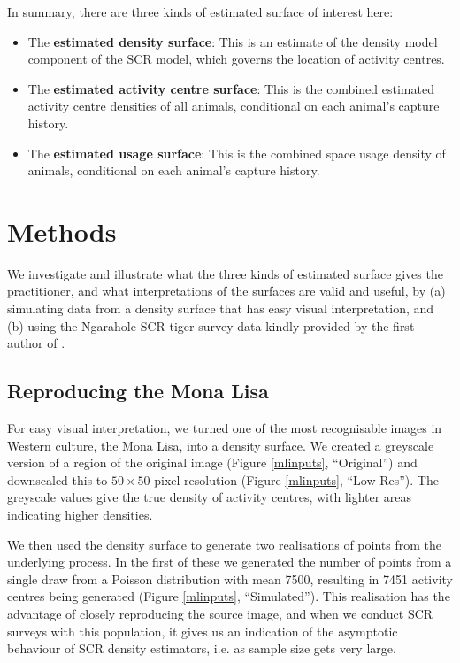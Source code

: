 \documentclass[10pt,a4paper]{article}
\begin{document}
In summary, there are three kinds of estimated surface of interest here: 
\begin{itemize}
\item The \textbf{estimated density surface}: This is an estimate of the density model component of the SCR model, which governs the location of activity centres.
\item The \textbf{estimated activity centre surface}: This is the combined estimated activity centre densities of all animals, conditional on each animal's capture history.
\item The \textbf{estimated usage surface}:  This is the combined space usage density of animals, conditional on each animal's capture history.
\end{itemize}



\section{Methods}

We investigate and illustrate what the three kinds of estimated surface gives the practitioner, and what interpretations of the surfaces are valid and useful, by (a) simulating data from a density surface that has easy visual interpretation, and (b) using the Ngarahole SCR tiger survey data kindly provided by the first author of \cite{Dorazio+Karanth:17}.

\subsection{Reproducing the Mona Lisa} \label{monalisa}

For easy visual interpretation, we turned one of the most recognisable images in Western culture, the Mona Lisa, into a density surface. We created a greyscale version of a region of the original image (Figure \ref{mlinputs}, ``Original'') and downscaled this to $50\times 50$ pixel resolution (Figure \ref{mlinputs}, ``Low Res'').  The greyscale values give the true density of activity centres, with lighter areas indicating higher densities. 

We then used the density surface  to generate two realisations of points from the underlying process. In the first of these we generated the number of points from a single draw from a Poisson distribution with mean 7500, resulting in 7451 activity centres being generated (Figure \ref{mlinputs}, ``Simulated''). This realisation has the advantage of closely reproducing the source image, and when we conduct SCR surveys with this population, it gives us an indication of the asymptotic behaviour of SCR density estimators, i.e. as sample size gets very large. %
\end{document}
